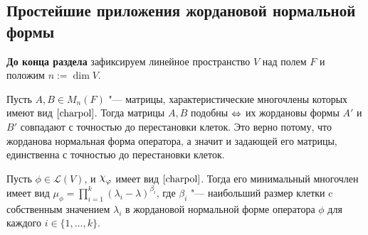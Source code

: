 \subsection{Простейшие приложения жордановой нормальной формы}

\textbf{До конца раздела} зафиксируем линейное пространство $V$ над полем $F$ и положим $n := \dim{V}$.

\begin{note}
	Пусть $A, B \in M_n(F)$ "--- матрицы, характеристические многочлены которых имеют вид $\eqref*{charpol}$. Тогда матрицы $A, B$ подобны $\Leftrightarrow$ их жордановы формы $A'$ и $B'$ совпадают с точностью до перестановки клеток. Это верно потому, что жорданова нормальная форма оператора, а значит и задающей его матрицы, единственна с точностью до перестановки клеток.
\end{note}

\begin{proposition}
	Пусть $\phi \in \mathcal{L}(V)$, и $\Chi_\phi$ имеет вид $\eqref*{charpol}$. Тогда его минимальный многочлен имеет вид $\mu_\phi = \prod_{i = 1}^{k}(\lambda_i - \lambda)^{\beta_i}$,
	где $\beta_i$ "--- наибольший размер клетки c собственным значением $\lambda_i$ в жордановой нормальной форме оператора $\phi$ для каждого $i \in \{1, \dotsc, k\}$.
\end{proposition}


